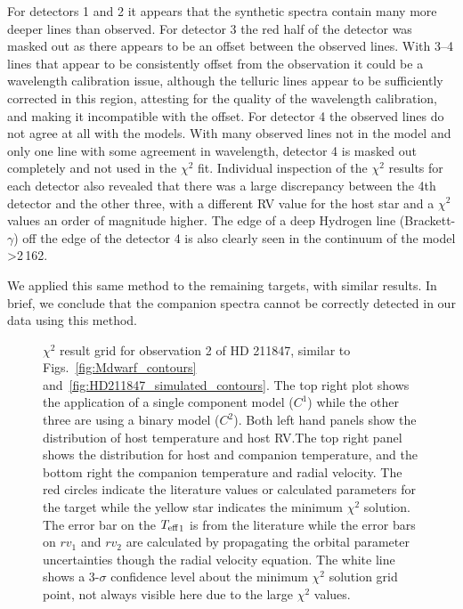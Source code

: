 For detectors 1 and 2 it appears that the synthetic spectra contain many more deeper lines than observed. For detector 3 the red half of the detector was masked out as there appears to be an offset between the observed lines. With 3--4 lines that appear to be consistently offset from the observation it could be a wavelength calibration issue, although the telluric lines appear to be sufficiently corrected in this region, attesting for the quality of the wavelength calibration, and making it incompatible with the offset. For detector 4 the observed lines do not agree at all with the models. With many observed lines not in the model and only one line with some agreement in wavelength, detector 4 is masked out completely and not used in the \(\chi^2\) fit. Individual inspection of the \(\chi^2\) results for each detector also revealed that there was a large discrepancy between the 4th detector and the other three, with a different {RV} value for the host star and a \(\chi^2\) values an order of magnitude higher. The edge of a deep Hydrogen line (Brackett-\(\gamma\)) off the edge of the detector 4 is also clearly seen in the continuum of the model >2\,162\nm{}.

We applied this same method to the remaining targets, with similar results. In brief, we conclude that the companion spectra cannot be correctly detected in our data using this method.
\begin{figure*}
    \centering
    \caption{\(\chi^2\) result grid for observation 2 of {HD 211847}, similar to Figs.~\ref{fig:Mdwarf_contours} and~\ref{fig:HD211847_simulated_contours}. The top right plot shows the application of a single component model (\(C^1\)) while the other three are using a binary model (\(C^2\)). Both left hand panels show the distribution of host temperature and host {RV}.\@ The top right panel shows the distribution for host and companion temperature, and the bottom right the companion temperature and radial velocity. The red circles indicate the literature values or calculated parameters for the target while the yellow star indicates the minimum \(\chi^2\) solution. The error bar on the \({T_{\mathrm{eff}}}_{1}\) is from the literature while the error bars on \({rv}_1\) and \({rv}_2\) are calculated by propagating the orbital parameter uncertainties though the radial velocity equation. The white line shows a 3-\(\sigma\) confidence level about the minimum \(\chi^2\) solution grid point, not always visible here due to the large \(\chi^2\) values.}
    \label{fig:HD211847_result_contours}
\end{figure*}


